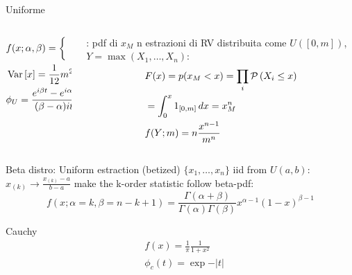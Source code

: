 \documentclass[asd-beamer.tex]{subfiles}
\begin{document}
\begin{frame}{Uniforme}
\begin{columns}[T]
	\begin{column}{0.5\textwidth}
	\begin{align*}
	&f(x;\alpha,\beta)=\left\{\begin{array}{c}\frac{1}{\beta-\alpha}\\0\\
	\end{array}\right.\\
	&\operatorname{Var}{[x]}=\frac{1}{12}m^2\\
	&\phi_U=\frac{e^{i\beta t}-e^{i\alpha t}}{(\beta-\alpha)it}
	\end{align*}
	\end{column}
	\begin{column}{0.5\textwidth}
	\begin{block}{: pdf di $x_M$}
		n estrazioni di RV distribuita come $U([0,m])$, $Y=\max{(X_1,\ldots,X_n)}$:
		\begin{align*}
		&F(x)=p(x_M<x)=\prod_i\operatorname{\mathcal{P}}{(X_i\leq x)}\\
		&=\int_0^x1_{[0,m]}\,dx=x_M^n\\
		&f(Y;m)=n\frac{x^{n-1}}{m^n}
		\end{align*}
	\end{block}
\end{column}
\end{columns}
\end{frame}

\begin{frame}{Beta distro: Uniform estraction (betized)}
$\{x_1,\ldots,x_n\}$ iid from $U(a,b)$: $x_{(k)}\to\frac{x_{(k)}-a}{b-a}$ make the k-order statistic follow beta-pdf:
\[f(x;\alpha=k,\beta=n-k+1)=\frac{\Gamma(\alpha+\beta)}{\Gamma(\alpha)\Gamma(\beta)}x^{\alpha-1}(1-x)^{\beta-1}\]
\end{frame}

\begin{frame}{Cauchy}
\begin{align*}
&f(x)=\frac{1}{\pi}\frac{1}{1+x^2}\\
&\phi_c(t)=\exp{-|t|}
\end{align*}
\end{frame}
\end{document}
